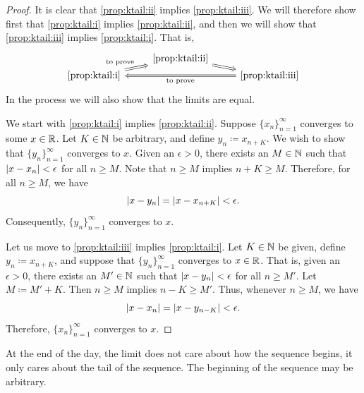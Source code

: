 \begin{proof}
It is clear that
\ref{prop:ktail:ii} implies \ref{prop:ktail:iii}.
We will therefore show first that
\ref{prop:ktail:i}
implies
\ref{prop:ktail:ii},
and then we will show that
\ref{prop:ktail:iii}
implies
\ref{prop:ktail:i}.  That is, 
\begin{equation*}
\begin{tikzcd}[row sep=0pt]
& \text{\ref{prop:ktail:ii}} \ar[dr, Rightarrow] & \\
\text{\ref{prop:ktail:i}} \ar[ur, Rightarrow, "\text{to prove}"] & &
\text{\ref{prop:ktail:iii}} \ar[ll, Rightarrow, "\text{to prove}"] 
\end{tikzcd}
\end{equation*}
In the process we will also show that the limits are equal.

We start with \ref{prop:ktail:i} implies \ref{prop:ktail:ii}.
Suppose $\{x_n \}_{n=1}^\infty$ converges to some $x \in {\mathbb{R}}$.
Let $K \in {\mathbb{N}}$ be arbitrary, and
define $y_n \coloneqq x_{n+K}$.  We wish to show that $\{ y_n \}_{n=1}^\infty$ converges
to $x$.
Given an $\epsilon > 0$, there exists an $M \in {\mathbb{N}}$ such that
$\left\lvert {x-x_n} \right\rvert < \epsilon$ for all $n \geq M$.
Note that $n \geq M$ implies $n+K \geq M$.  Therefore, for
all $n \geq M$, we have
\begin{equation*}
\left\lvert {x-y_n} \right\rvert = \left\lvert {x-x_{n+K}} \right\rvert < \epsilon .
\end{equation*}
Consequently, $\{ y_n \}_{n=1}^\infty$ converges to $x$.

Let us move to \ref{prop:ktail:iii} implies \ref{prop:ktail:i}.
Let $K \in {\mathbb{N}}$ be given, define
$y_n \coloneqq x_{n+K}$, and suppose that $\{ y_n \}_{n=1}^\infty$ converges to $x \in {\mathbb{R}}$.
That is, given an $\epsilon > 0$, there exists an $M' \in {\mathbb{N}}$ such that
$\left\lvert {x-y_n} \right\rvert < \epsilon$ for all $n \geq M'$.
Let $M \coloneqq M'+K$.  Then $n \geq M$ implies $n-K \geq M'$.
Thus, whenever $n \geq M$, we have
\begin{equation*}
\left\lvert {x-x_n} \right\rvert = \left\lvert {x-y_{n-K}} \right\rvert < \epsilon.
\end{equation*}
Therefore, $\{ x_n \}_{n=1}^\infty$ converges to $x$.
\end{proof}

At the end of the day, the limit does not care about how the sequence begins, it only
cares about the tail of the sequence.  The beginning of the sequence
may be arbitrary.

